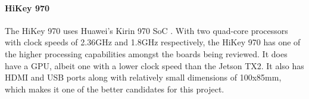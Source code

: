 \documentclass[../../initial_thesis.tex]{subfiles}
\begin{document}
\paragraph{HiKey 970}
The HiKey 970 uses Huawei's Kirin 970 SoC \cite{hikeyDatasheet}. With two quad-core processors with clock speeds of 2.36GHz and 1.8GHz respectively, the HiKey 970 has one of the higher processing capabilities amongst the boards being reviewed. It does have a GPU, albeit one with a lower clock speed than the Jetson TX2. It also has HDMI and USB ports along with relatively small dimensions of 100x85mm, which makes it one of the better candidates for this project.
\end{document}
